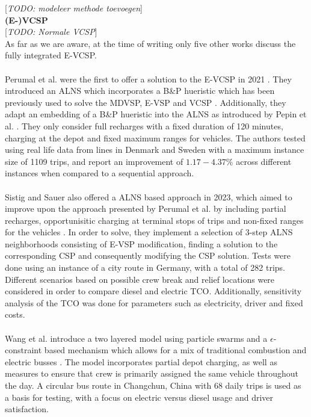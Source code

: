 \documentclass[]{article}
\newcommand{\todo}[1]{{\color{red}[\textit{TODO: #1}]}}
\begin{document}
\todo{modeleer methode toevoegen}\\

\noindent \textbf{(E-)VCSP}\\
\todo{Normale VCSP}\\
As far as we are aware, at the time of writing only five other works discuss the fully integrated E-VCSP. \\\\

Perumal et al. were the first to offer a solution to the E-VCSP in 2021
\cite{Perumal2021}. They introduced an ALNS which incorporates a B\&P hueristic
which has been previously used to solve the MDVSP, E-VSP and VCSP
\cite{Pepin2009, Haase1996, vanKootenNiekerk2017}. Additionally, they adapt an
embedding of a B\&P hueristic into the ALNS as introduced by Pepin et al.
\cite{Pepin2009}. They only consider full recharges with a fixed duration of
120 minutes, charging at the depot and fixed maximum ranges for vehicles. The
authors tested using real life data from lines in Denmark and Sweden with a
maximum instance size of 1109 trips, and report an improvement of $1.17-4.37\%$
across different instances when compared to a sequential approach. \\\\

Sistig and Sauer also offered a ALNS based approach in 2023, which aimed to
improve upon the approach presented by Perumal et al. by including partial
recharges, opportunisitic charging at terminal stops of trips and non-fixed
ranges for the vehicles \cite{Sistig2023}. In order to solve, they implement a
selection of 3-step ALNS neighborhoods consisting of E-VSP modification,
finding a solution to the corresponding CSP and consequently modifying the CSP
solution. Tests were done using an instance of a city route in Germany, with a
total of 282 trips. Different scenarios based on possible crew break and relief
locations were considered in order to compare diesel and electric TCO.
Additionally, sensitivity analysis of the TCO was done for parameters such as
electricity, driver and fixed costs. \\\\

Wang et al. introduce a two layered model using particle swarms and a
$\epsilon$-constraint based mechanism which allows for a mix of traditional
combustion and electric busses \cite{Wang2022}. The model incorporates partial
depot charging, as well as measures to ensure that crew is primarily assigned
the same vehicle throughout the day. A circular bus route in Changchun, China
with 68 daily trips is used as a basis for testing, with a focus on electric
versus diesel usage and driver satisfaction. \\\\
\end{document}
